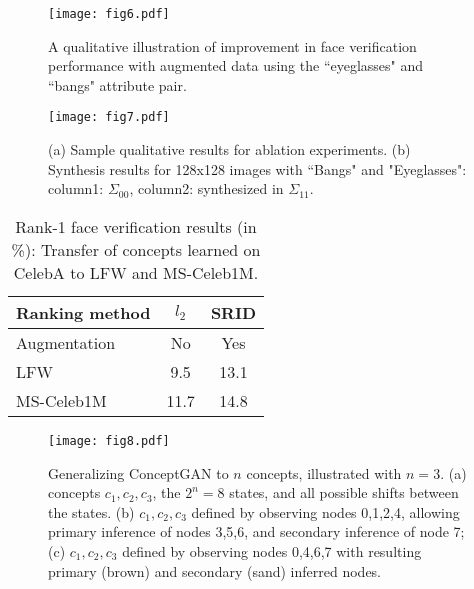 \documentclass[10pt,twocolumn,letterpaper]{article}
\begin{document}
\begin{figure}%
\begin{center}
\texttt{[image: fig6.pdf]}
\end{center}
   \caption{A qualitative illustration of improvement in face verification performance with augmented data using the ``eyeglasses" and ``bangs" attribute pair.}
\vspace{-1.3em}
\label{fig:rankImprovement}
\end{figure}

\begin{figure}
\begin{center}
   \texttt{[image: fig7.pdf]}
\end{center}
\vspace{-2.3em}
\caption{(a) Sample qualitative results for ablation experiments. (b) Synthesis results for 128x128 images with ``Bangs" and "Eyeglasses": column1: $\Sigma_{00}$, column2: synthesized in $\Sigma_{11}$.}
\label{fig:ablationFig}
\end{figure}


\begin{table}
\centering
\begin{tabular}{lcc}
\toprule
Ranking method & $l_{2}$ & SRID \\
\toprule
Augmentation &No & Yes \\
\toprule
LFW &9.5 &13.1 \\
MS-Celeb1M  &11.7 &14.8\\
\bottomrule
\end{tabular}
\vspace{-1em}
\caption{Rank-1 face verification results (in \%): Transfer of concepts learned on CelebA to LFW and MS-Celeb1M.}
\label{tab:faceTransferResults}
\end{table}

\begin{figure}[!t]
\begin{center}
\texttt{[image: fig8.pdf]}
\end{center}
   \caption{Generalizing ConceptGAN to $n$ concepts, illustrated with $n=3$. (a) concepts $c_1, c_2, c_3$, the $2^n=8$ states, and all possible shifts between the states. (b) $c_1, c_2, c_3$ defined by observing nodes 0,1,2,4, allowing primary inference of nodes 3,5,6, and secondary inference of node 7; (c) $c_1, c_2, c_3$ defined by observing nodes 0,4,6,7 with resulting primary (brown) and secondary (sand) inferred nodes.}
\vspace{-2em}
\label{fig:gen}
\end{figure}
\end{document}
